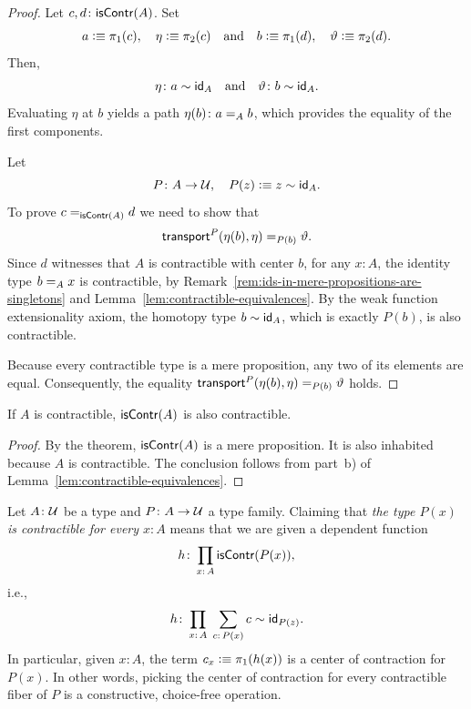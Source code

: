 \begin{proof}
    Let $c,d\colon\fun{isContr}(A)$. Set
    \[
        a\mathrel{\vcentcolon}\equiv\pi_1(c),\quad\eta\mathrel{\vcentcolon}\equiv\pi_2(c)
        \quad\text{and}\quad
        b\mathrel{\vcentcolon}\equiv\pi_1(d),\quad\vartheta\mathrel{\vcentcolon}\equiv\pi_2(d).
    \]
    Then,
    \[
        \eta\colon a\sim\id_A
        \quad\text{and}\quad
        \vartheta\colon b\sim\id_A.
    \]
    Evaluating $\eta$ at $b$ yields a path $\eta(b)\colon a\eq Ab$, which provides the equality of the first components. 

    Let
    \[
        P\colon A\to\univ,
        \quad P(z)\defeq z\sim\id_A.
    \]
    To prove $c\mathrel{=_{\mathsf{isContr}(A)}}d$ we need to show that
    \[
        \mathsf{transport}^P(\eta(b),\eta)\mathrel{=_{P(b)}}\vartheta.
    \]
    Since $d$ witnesses that $A$ is contractible with center $b$, for any $x\colon A$, the identity type $b\mathrel{=_{A}}x$ is contractible, by Remark~\ref{rem:ids-in-mere-propositions-are-singletons} and Lemma~\ref{lem:contractible-equivalences}. By the weak function extensionality axiom, the homotopy type $b\sim\mathsf{id}_A$, which is exactly $P(b)$, is also contractible. 

    Because every contractible type is a mere proposition, any two of its elements are equal. Consequently, the equality $\mathsf{transport}^P(\eta(b),\eta)\mathrel{=_{P(b)}}\vartheta$ holds.
\end{proof}


\begin{cor}\we\label{cor:A-contractible-implies-isContr(A)-contractible}
    If\/ $A$ is contractible, $\mathsf{isContr}(A)$ is also contractible.
\end{cor}

\begin{proof}
    By the theorem, $\mathsf{isContr}(A)$ is a mere proposition. It is also inhabited because $A$ is contractible.  The conclusion follows from part~b) of Lemma~\ref{lem:contractible-equivalences}.
\end{proof}

\begin{rem}\label{rem:choice-free-center-construction}
    Let $A\colon\univ$ be a type and $P\colon A\to\univ$ a type family. Claiming that \textit{the type $P(x)$ is contractible for every $x\colon A$} means that we are given a dependent function
    \[
        h\colon\prod_{x\colon A}\fun{isContr}(P(x)),
    \]
    i.e.,
    \[
        h\colon\prod_{x\colon A}\;
            \sum_{c\colon P(x)}c\sim\id_{P(z)}.
    \]
    In particular, given $x\colon A$, the term $c_x\mathrel{\vcentcolon}\equiv\pi_1(h(x))$ is a center of contraction for $P(x)$. In other words, picking the center of contraction for every contractible fiber of $P$ is a constructive, choice-free operation.
\end{rem}


